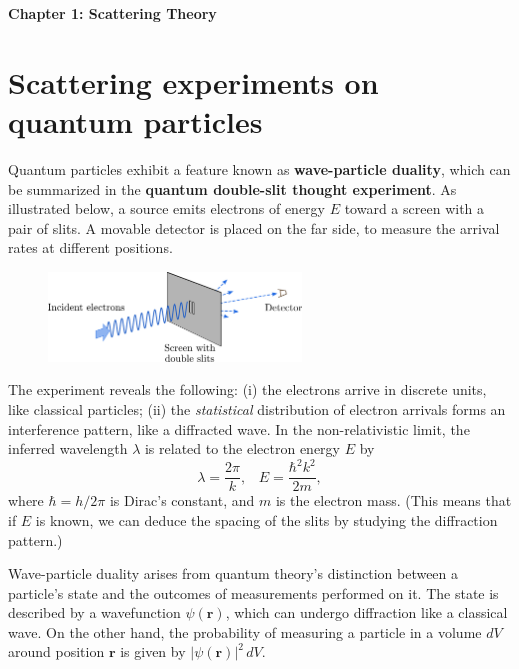 \documentclass[pra,12pt]{revtex4}
\begin{document}
\begin{center}
{\Large \textbf{Chapter 1: Scattering Theory}}
\end{center}


\section{Scattering experiments on quantum particles}

Quantum particles exhibit a feature known as \textbf{wave-particle
  duality}, which can be summarized in the \textbf{quantum double-slit
  thought experiment}.  As illustrated below, a source emits electrons
of energy $E$ toward a screen with a pair of slits.  A movable
detector is placed on the far side, to measure the arrival rates at
different positions.

\begin{figure}[h]
  \centering\includegraphics[width=0.6\textwidth]{doubleslit}
\end{figure}

The experiment reveals the following: (i) the electrons arrive in
discrete units, like classical particles; (ii) the
\textit{statistical} distribution of electron arrivals forms an
interference pattern, like a diffracted wave.  In the non-relativistic
limit, the inferred wavelength $\lambda$ is related to the electron
energy $E$ by
\begin{equation}
  \lambda = \frac{2\pi}{k}, \;\;\; E = \frac{\hbar^2k^2}{2m},
\end{equation}
where $\hbar = h/2\pi$ is Dirac's constant, and $m$ is the electron
mass.  (This means that if $E$ is known, we can deduce the spacing of
the slits by studying the diffraction pattern.)

Wave-particle duality arises from quantum theory's distinction between
a particle's state and the outcomes of measurements performed on it.
The state is described by a wavefunction $\psi(\mathbf{r})$, which can
undergo diffraction like a classical wave.  On the other hand, the
probability of measuring a particle in a volume $dV$ around position
$\mathbf{r}$ is given by $|\psi(\mathbf{r})|^2 \,dV$.
\end{document}
